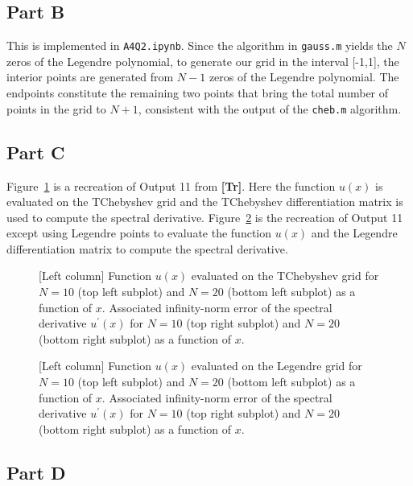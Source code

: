 \documentclass[12pt]{article}
\begin{document}
\subsection*{Part B}

This is implemented in \verb|A4Q2.ipynb|. Since the algorithm in \verb|gauss.m| yields the $N$ zeros of the Legendre polynomial, to generate our grid in the interval [-1,1], the interior points are generated from $N-1$ zeros of the Legendre polynomial. The endpoints 
constitute the remaining two points that bring the total number of points in the grid to $N+1$, consistent with the output of the \verb|cheb.m| algorithm. 

\subsection*{Part C}

Figure~\ref{fig:tchebyshev_err} is a recreation of Output 11 from \textbf{[Tr]}. Here the function $u(x)$ is evaluated on the TChebyshev grid and the TChebyshev differentiation matrix is used to compute the spectral derivative. Figure~\ref{fig:legendre_err} is the recreation of Output 11 except using Legendre points to evaluate the function $u(x)$ and the Legendre differentiation matrix to compute the spectral derivative.

\begin{figure}[!h]
	\centering
	\caption{[Left column] Function $u(x)$ evaluated on the TChebyshev grid for $N=10$ (top left subplot) and $N=20$ (bottom left subplot) as a function of $x$. Associated infinity-norm error of the spectral derivative $u^{\prime}(x)$ for $N=10$ (top right subplot) and $N=20$ (bottom right subplot) as a function of $x$.}
	\label{fig:tchebyshev_err}
\end{figure}

\begin{figure}[!h]
	\centering	
	\caption{[Left column] Function $u(x)$ evaluated on the Legendre grid for $N=10$ (top left subplot) and $N=20$ (bottom left subplot) as a function of $x$. Associated infinity-norm error of the spectral derivative $u^{\prime}(x)$ for $N=10$ (top right subplot) and $N=20$ (bottom right subplot) as a function of $x$.}
	\label{fig:legendre_err}
\end{figure}

\subsection*{Part D}
\end{document}
